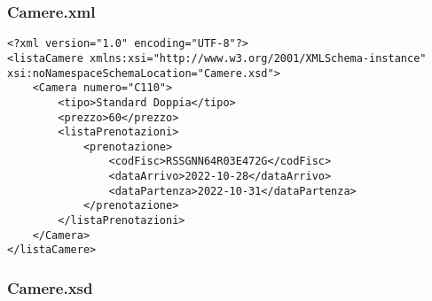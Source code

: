 \documentclass [a4paper, 12pt]{book}
\begin{document}
\subsubsection{Camere.xml}
\begin{lstlisting}[style=XML] 	
<?xml version="1.0" encoding="UTF-8"?>
<listaCamere xmlns:xsi="http://www.w3.org/2001/XMLSchema-instance" xsi:noNamespaceSchemaLocation="Camere.xsd">
    <Camera numero="C110">
        <tipo>Standard Doppia</tipo>
        <prezzo>60</prezzo>
        <listaPrenotazioni>
            <prenotazione>
                <codFisc>RSSGNN64R03E472G</codFisc>
                <dataArrivo>2022-10-28</dataArrivo>
                <dataPartenza>2022-10-31</dataPartenza>
            </prenotazione>
        </listaPrenotazioni>
    </Camera>
</listaCamere>
\end{lstlisting}
\subsubsection{Camere.xsd}
\end{document}

